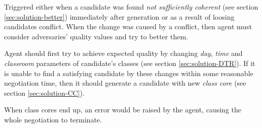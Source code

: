 \documentclass[../../ThesisDoc]{subfiles}
\begin{document}
Triggered either when a candidate was found \emph{not sufficiently coherent}
(see section \ref{sec:solution-better}) immediately after generation
or as a result of loosing candidates conflict.
When the change was caused by a conflict, then agent must consider adversaries'
quality values and try to better them.

Agent should first try to achieve expected quality by changing
\emph{day}, \emph{time} and \emph{classroom} parameters of candidate's classes
(see section \ref{sec:solution-DTR}).
If it is unable to find a satisfying candidate by these changes within some
reasonable negotiation time, then it should generate a candidate with new
\emph{class core} (see section \ref{sec:solution-CC}).

When class cores end up, an error would be raised by the agent, causing the whole
negotiation to terminate.

\end{document}
